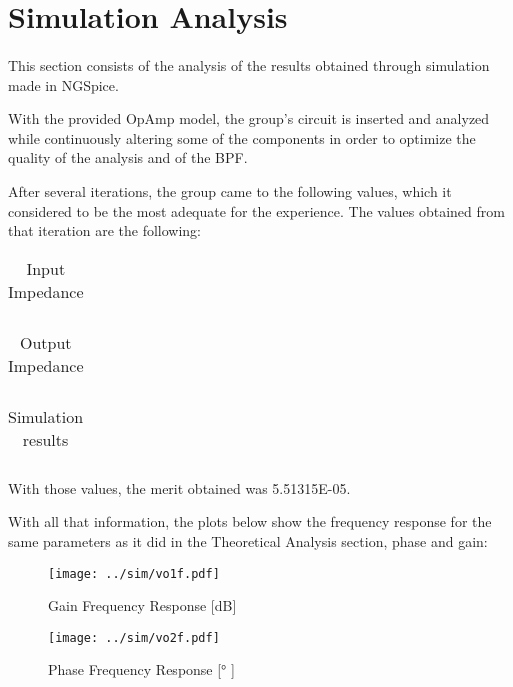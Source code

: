 \section{Simulation Analysis}
\label{sec:simulation}
\paragraph{}
\par This section consists of the analysis of the results obtained through simulation made in NGSpice.
\par With the provided OpAmp model, the group's circuit is inserted and analyzed while continuously altering some of the components in order to optimize the quality of the analysis and of the BPF.
\par After several iterations, the group came to the following values, which it considered to be the most adequate for the experience. The values obtained from that iteration are the following:
		
\begin{table}[H]
  \centering
  \begin{tabular}{|c|c|}
    \hline    
    
  \end{tabular}
  \caption{Input Impedance}
  \label{sim1}
\end{table}


\begin{table}[H]
  \centering
  \begin{tabular}{|c|c|}
    \hline    
    
  \end{tabular}
  \caption{Output Impedance}
  \label{sim1}
\end{table}

\begin{table}[H]
  \centering
  \begin{tabular}{|c|c|}
    \hline    
    
    
  \end{tabular}
  \caption{Simulation results}
  \label{sim1}
\end{table}
\par With those values, the merit obtained was 5.51315E-05.
\par With all that information, the plots below show the frequency response for the same parameters as it did in the Theoretical Analysis section, phase and gain:

\begin{figure}[H]
    \texttt{[image: ../sim/vo1f.pdf]}
    \centering
    \caption{Gain Frequency Response [dB]}
    \label{mag}
\end{figure}

\begin{figure}[H]
    \texttt{[image: ../sim/vo2f.pdf]}
    \centering
    \caption{Phase Frequency Response [° ]}
    \label{mag}
\end{figure}
